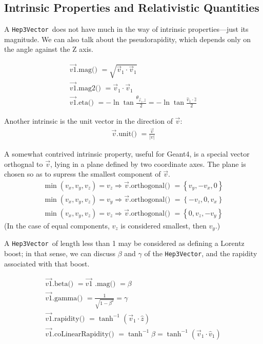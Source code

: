 \documentclass[twoside,12pt]{article}
\def \SV {{\tt Hep3Vector}}
\begin{document}
\subsection{Intrinsic Properties and Relativistic Quantities}

A \SV\ does not have much in the way of intrinsic properties---just its
magnitude.
We can also talk about the pseudorapidity, which depends only on the angle
against the Z axis.

\begin{eqnarray}
  \vec{v1}\mbox{.mag() } = \sqrt { \vec{v}_{1} \cdot \vec{v}_{1} }
    \label{eq:mag} \\
  \vec{v1}\mbox{.mag2() } = \vec{v}_{1} \cdot \vec{v}_{1}
    \label{eq:mag2} \\
  \vec{v1}\mbox{.eta() } = 	-\ln \tan \frac {\theta_{\vec{v}_1,\hat{z}}}{2}
    = -\ln \tan \frac {\hat{v}_1 \cdot \hat{z}}{2}
    \label{eq:eta}
\end{eqnarray}

Another intrinsic is the unit vector in the direction of $\vec{v}$:
\begin{eqnarray}
  \vec{v}\mbox{.unit() } = \frac{\vec{v}}{|v|}
    \label{eq:svunit} 
\end{eqnarray}

A somewhat contrived intrinsic property, useful for Geant4, is a special 
vector orthognal to $\vec{v}$, lying in a plane defined by two coordinate 
axes.
The plane is chosen so as to supress the smallest component of $\vec{v}$.
\begin{eqnarray}
  \min( v_x, v_y, v_z ) = v_z \Longrightarrow 
		\vec{v}\mbox{.orthogonal() } = \left\{ v_y, -v_x, 0 \right\}
    \label{eq:orthogonal} \\
  \min( v_x, v_y, v_z ) = v_y \Longrightarrow 
		\vec{v}\mbox{.orthogonal() } = \left\{ -v_z, 0, v_x \right\}
    \nonumber \\
  \min( v_x, v_y, v_z ) = v_z \Longrightarrow 
		\vec{v}\mbox{.orthogonal() } = \left\{ 0, v_z, -v_y \right\}
    \nonumber 
\end{eqnarray}
(In the case of equal components, $v_z$ is considered smallest, then $v_y$.)


\noindent
A \SV\ of length less than 1 may be considered as defining a Lorentz boost;
in that sense, we can discuss $\beta$ and $\gamma$ of the \SV, and the rapidity
associated with that boost.

\begin{eqnarray}
  \vec{v1}\mbox{.beta() } = \vec{v1}\mbox{ .mag() } = \beta
    \label{eq:mag:2} \label{eq:beta} \\
  \vec{v1}\mbox{.gamma() } = \frac{1} {\sqrt {1-\beta^2 } } = \gamma
    \label{eq:gamma} \\
  \vec{v1}\mbox{.rapidity() } = \tanh^{-1} (\vec{v}_{1} \cdot \hat{z})
    \label{eq:rap} \\
  \vec{v1}\mbox{.coLinearRapidity() } = \tanh^{-1} \beta
    = \tanh^{-1} (\vec{v}_{1} \cdot \hat{v}_1)
    \label{eq:coLinRap}
\end{eqnarray}
\end{document}

